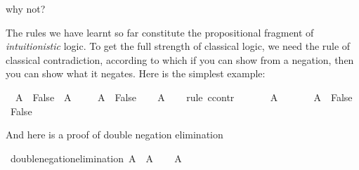 \begin{isabellebody}
\begin{isamarkuptext}
why not?%
\end{isamarkuptext}\isamarkuptrue%
%
\isadelimdocument
%
\endisadelimdocument
%
\isatagdocument
%
\isamarkuptrue%
%
\endisatagdocument
{\isafolddocument}%
%
\isadelimdocument
%
\endisadelimdocument
%
\begin{isamarkuptext}%
The rules we have learnt so far constitute the propositional fragment of \emph{intuitionistic}
logic. To get the full strength of classical logic, we need the rule of classical contradiction,
according to which if you can show  from a negation, then you can show what it negates.
Here is the simplest example:%
\end{isamarkuptext}\isamarkuptrue%
\isamarkupfalse%
\ {\isachardoublequoteopen}{\isacharparenleft}{\isasymnot}\ A\ {\isasymlongrightarrow}\ False{\isacharparenright}\ {\isasymlongrightarrow}\ A{\isachardoublequoteclose}\isanewline
%
\isadelimproof
%
\endisadelimproof
%
\isatagproof
{}\isamarkupfalse%
\isanewline
\ \ \isamarkupfalse%
\ {\isachardoublequoteopen}{\isasymnot}\ A\ {\isasymlongrightarrow}\ False{\isachardoublequoteclose}\isanewline
\ \ \isamarkupfalse%
\ {\isachardoublequoteopen}A{\isachardoublequoteclose}\isanewline
\ \ \isamarkupfalse%
\ {\isacharparenleft}rule\ ccontr{\isacharparenright}\isanewline
\ \ \ \ \isamarkupfalse%
\ {\isachardoublequoteopen}{\isasymnot}\ A{\isachardoublequoteclose}\isanewline
\ \ \ \ \isamarkupfalse%
\ {\isacharbackquoteopen}{\isasymnot}\ A\ {\isasymlongrightarrow}\ False{\isacharbackquoteclose}\ \isamarkupfalse%
\ {\isachardoublequoteopen}False{\isachardoublequoteclose}\isacommand{{\isachardot}{\isachardot}}\isamarkupfalse%
\isanewline
\ \ \isamarkupfalse%
\isanewline
{}\isamarkupfalse%
%
\endisatagproof
{\isafoldproof}%
%
\isadelimproof
%
\endisadelimproof
%
\begin{isamarkuptext}%
And here is a proof of double negation elimination%
\end{isamarkuptext}\isamarkuptrue%
\isamarkupfalse%
\ double{\isacharunderscore}negation{\isacharunderscore}elimination{\isacharcolon}\ {\isachardoublequoteopen}{\isasymnot}{\isasymnot}A\ {\isasymlongrightarrow}\ A{\isachardoublequoteclose}\isanewline
%
\isadelimproof
%
\endisadelimproof
%
\isatagproof
{}\isamarkupfalse%
\isanewline
\ \ \isamarkupfalse%
\ {\isachardoublequoteopen}{\isasymnot}{\isasymnot}A{\isachardoublequoteclose}\isanewline

\end{isabellebody}
